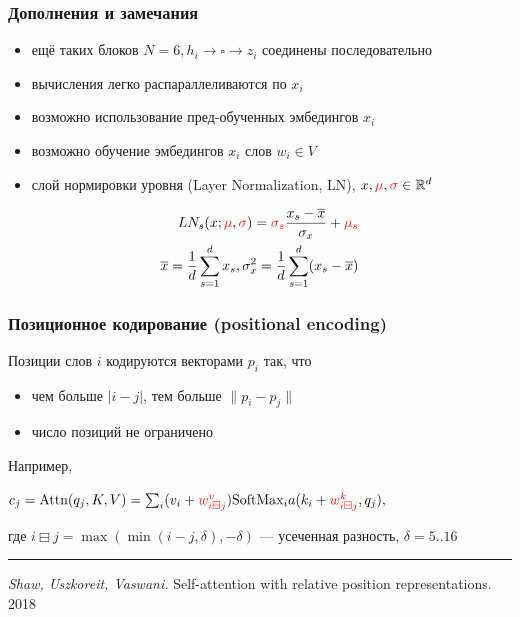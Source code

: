 \documentclass[fullscreen=true, bookmarks=true, hyperref={pdfencoding=unicode}]{beamer}
\begin{document}
\begin{frame}
  \frametitle{Дополнения и замечания}

   \begin{itemize}
     \item ещё таких блоков $N=6, h_i \to \square \to z_i$ соединены последовательно
     \item вычисления легко распараллеливаются по $x_i$
     \item возможно использование пред-обученных эмбедингов $x_i$
     \item возможно обучение эмбедингов $x_i$ слов $w_i \in V$
     \item слой нормировки уровня (Layer Normalization, LN), $x, {\color{red}\mu}, {\color{red}\sigma} \in \mathbb{R}^d$
   \end{itemize}

   \begin{align*}
     LN_s(x; {\color{red}\mu}, {\color{red}\sigma}) = {\color{red}\sigma_s} \frac{x_s - \overline{x}}{\sigma_x} + {\color{red}\mu_s} \\
     \overline{x} = \frac{1}{d} \sum\limits_{s=1}^d x_s, \sigma_x^2 = \frac{1}{d} \sum\limits_{s=1}^d (x_s - \overline{x})
   \end{align*}
 \end{frame}


\begin{frame}
  \frametitle{Позиционное кодирование (positional encoding)}

  Позиции слов $i$ кодируются векторами $p_i$ так, что
  \begin{itemize}
    \item чем больше $|i-j|$, тем больше $\|p_i-p_j\|$
    \item число позиций не ограничено
  \end{itemize}

  Например,

  $ c_j = \text{Attn}(q_j, K, V) = \sum_i (v_i + {\color{red}w^v_{i\boxminus j}}) \text{SoftMax}_i a(k_i + {\color{red} w^k_{i\boxminus j}}, q_j), $

  где $i\boxminus j = \max(\min(i-j, \delta), -\delta)$ — усеченная разность, $\delta = 5..16$

  \vspace{1cm}
  \noindent\rule{8cm}{0.4pt}

  {\small
  {\it Shaw, Uszkoreit, Vaswani.} Self-attention with relative position representations. 2018}
\end{frame}
\end{document}
